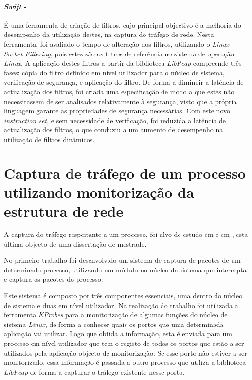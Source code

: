 \paragraph*{\textit{Swift} - }
É uma ferramenta de criação de filtros, cujo principal objectivo é a melhoria do desempenho da utilização destes, na captura do tráfego de rede.
Nesta ferramenta, foi avaliado o tempo de alteração dos filtros, utilizando o \textit{Linux Socket Filtering}, pois estes são os filtros de referência no sistema de operação \textit{Linux}.
A aplicação destes filtros a partir da biblioteca \textit{LibPcap} compreende três fases: cópia do filtro definido em nível utilizador para o núcleo de sistema, verificação de segurança, e aplicação do filtro.
De forma a diminuir a latência de actualização dos filtros, foi criada uma especificação de modo a que estes não necessitassem de ser analisados relativamente à segurança, visto que a própria linguagem garante as propriedades de segurança necessárias.
Com este novo \textit{instruction set}, e sem necessidade de verificação, foi reduzida a latência de actualização dos filtros, o que conduziu a um aumento de desempenho na utilização de filtros dinâmicos.

\section{Captura de tráfego de um processo utilizando monitorização da estrutura de rede}
\label{sect:outras_abordagens}

A captura do tráfego respeitante a um processo, foi alvo de estudo em \cite{1688981} e em \cite{Farruca:2009}, esta última objecto de uma dissertação de mestrado.

No primeiro trabalho foi desenvolvido um sistema de captura de pacotes de um determinado processo, utilizando um módulo no núcleo de sistema que intercepta e captura os pacotes do processo.

Este sistema é composto por três componentes essenciais, uma dentro do núcleo de sistema e duas em nível utilizador.
Na realização do trabalho foi utilizada a ferramenta \textit{KProbes} para a monitorização de algumas funções do núcleo de sistema \textit{Linux}, de forma a conhecer quais os portos que uma determinada aplicação vai utilizar.
Logo que obtida a informação, esta é enviada para um processo em nível utilizador que tem o registo de todos os portos que estão a ser utilizados pela aplicação objecto de monitorização.
Se esse porto não estiver a ser monitorizado, essa informação é passada a outro processo que utiliza a biblioteca \textit{LibPcap} de forma a capturar o tráfego existente nesse porto.


